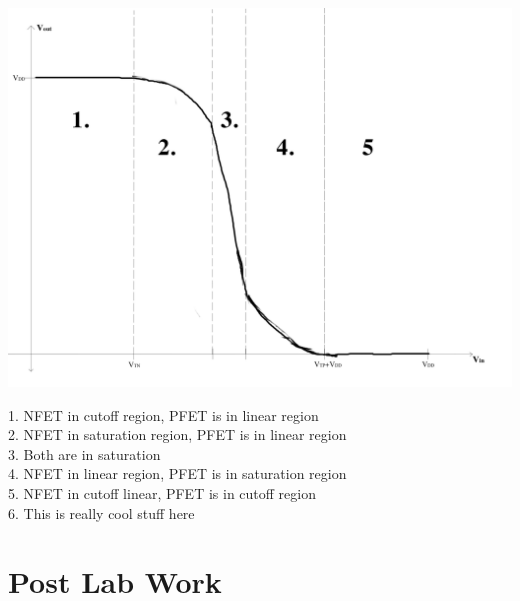\documentclass[12pt, oneside]{article}
\begin{document}
\begin{center}
\includegraphics[scale=.1]{part_g}\\
\end{center}
1. NFET in cutoff region, PFET is in linear region\\
2. NFET in saturation region, PFET is in linear region\\
3. Both are in saturation\\
4. NFET in linear region, PFET is in saturation region\\
5. NFET in cutoff linear, PFET is in cutoff region\\
6. This is really cool stuff here

\section{Post Lab Work}
\end{document}
